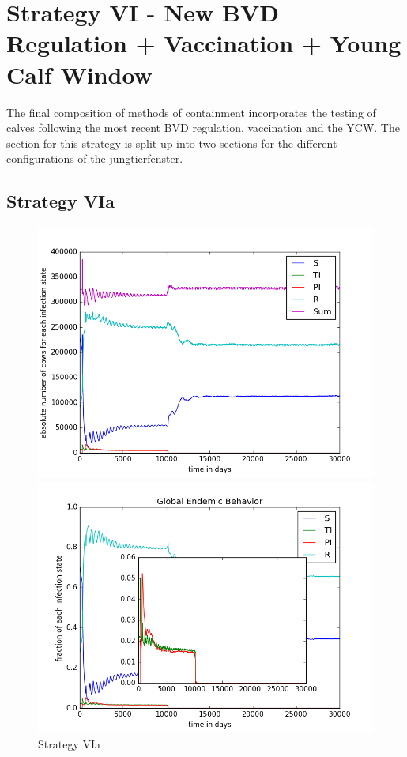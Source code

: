 \section{Strategy VI - New BVD Regulation + Vaccination + Young Calf Window} 
The final composition of methods of containment incorporates the testing of calves following the most recent BVD regulation, vaccination and the YCW. The section for this strategy is split up into two sections for the different configurations of the jungtierfenster.
\subsection{Strategy VIa}

\begin{figure}[htbp]
\begin{minipage}{0.5\textwidth}
\centering
\noindent\includegraphics[width=0.95\linewidth,height=\textheight,
keepaspectratio]{cont6totalEndemicNumbers.png} 
\end{minipage}
\begin{minipage}{0.5\textwidth}
\centering
\noindent\includegraphics[width=0.95\linewidth,height=\textheight,
keepaspectratio]{cont6pendemicFractions.png} 
\end{minipage}
\caption[Endemic Behavior in Containment Strategy Six A]{Strategy VIa}
\label{fig:contStrat6a}
\end{figure}
